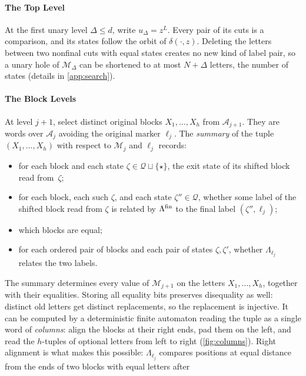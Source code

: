 \paragraph{The Top Level}
At the first unary level $\Delta\le d$, write $u_\Delta = z^L$. Every pair of its cuts is a
comparison, and its states follow the orbit of $\delta(\cdot,z)$. Deleting the letters between
two nonfinal cuts with equal states creates no new kind of label pair, so a unary hole of
$\mathcal{M}_\Delta$ can be shortened to at most $N + \Delta$ letters, the number of states
(details in \cref{app:search}).



\paragraph{The Block Levels}
At level $j+1$, select distinct original blocks $X_1,\dots,X_h$ from
$\mathcal A_{j+1}$. They are words over $\mathcal A_j$ avoiding the
original marker $\ell_j$. The \emph{summary} of the tuple
$(X_1,\dots,X_h)$ with respect to $\mathcal{M}_j$ and $\ell_j$ records:
\begin{itemize}[leftmargin=*]
\item for each block and each state $\zeta \in \mathcal Q \sqcup \{\star\}$, the exit state of its shifted
  block read from~$\zeta$;
\item for each block, each such $\zeta$, and each state $\zeta''\in\mathcal Q$, whether some label of the shifted
  block read from $\zeta$ is related by $\Lambda^{\mathrm{fin}}$ to the final label $(\zeta'',\ell_j)$;
\item which blocks are equal;
\item for each ordered pair of blocks and each pair of states $\zeta, \zeta'$, whether
  $\Lambda_{\ell_j}$ relates the two labels.
\end{itemize}
The summary determines every value of $\mathcal{M}_{j+1}$ on the letters $X_1,\dots,X_h$,
together with their equalities. Storing all equality bits preserves
disequality as well: distinct old letters get distinct replacements, so
the replacement is injective. It can be computed by a deterministic finite automaton
reading the tuple as a single word of \emph{columns}: align the blocks at their right ends,
pad them on the left, and read the $h$-tuples of optional letters from left to right
(\cref{fig:columns}). Right alignment is what makes this possible: $\Lambda_{\ell_j}$
compares positions at equal distance from the ends of two blocks with equal letters after
